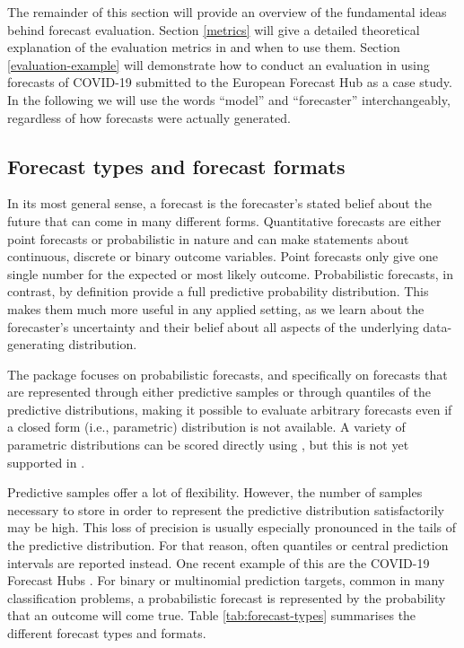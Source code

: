 \documentclass[
]{jss}
\begin{document}
The remainder of this section will provide an overview of the
fundamental ideas behind forecast evaluation. Section \ref{metrics} will
give a detailed theoretical explanation of the evaluation metrics in
 and when to use them. Section
\ref{evaluation-example} will demonstrate how to conduct an evaluation
in  using forecasts of COVID-19 submitted to the
European Forecast Hub
\citep{europeancovid-19forecasthubEuropeanCovid19Forecast2021} as a case
study. In the following we will use the words ``model'' and
``forecaster'' interchangeably, regardless of how forecasts were
actually generated.

\hypertarget{forecast-types-and-forecast-formats}{%
\subsection{Forecast types and forecast
formats}\label{forecast-types-and-forecast-formats}}

In its most general sense, a forecast is the forecaster's stated belief
about the future \citep{gneitingStrictlyProperScoring2007} that can come
in many different forms. Quantitative forecasts are either point
forecasts or probabilistic in nature and can make statements about
continuous, discrete or binary outcome variables. Point forecasts only
give one single number for the expected or most likely outcome.
Probabilistic forecasts, in contrast, by definition provide a full
predictive probability distribution. This makes them much more useful in
any applied setting, as we learn about the forecaster's uncertainty and
their belief about all aspects of the underlying data-generating
distribution.

The  package focuses on probabilistic forecasts, and
specifically on forecasts that are represented through either predictive
samples or through quantiles of the predictive distributions, making it
possible to evaluate arbitrary forecasts even if a closed form (i.e.,
parametric) distribution is not available. A variety of parametric
distributions can be scored directly using , but this
is not yet supported in .

Predictive samples offer a lot of flexibility. However, the number of
samples necessary to store in order to represent the predictive
distribution satisfactorily may be high. This loss of precision is
usually especially pronounced in the tails of the predictive
distribution. For that reason, often quantiles or central prediction
intervals are reported instead. One recent example of this are the
COVID-19 Forecast Hubs
\citep{cramerCOVID19ForecastHub2020, cramerEvaluationIndividualEnsemble2021, bracherShorttermForecastingCOVID192021, bracherNationalSubnationalShortterm2021, europeancovid-19forecasthubEuropeanCovid19Forecast2021}.
For binary or multinomial prediction targets, common in many
classification problems, a probabilistic forecast is represented by the
probability that an outcome will come true. Table
\ref{tab:forecast-types} summarises the different forecast types and
formats.
\end{document}
